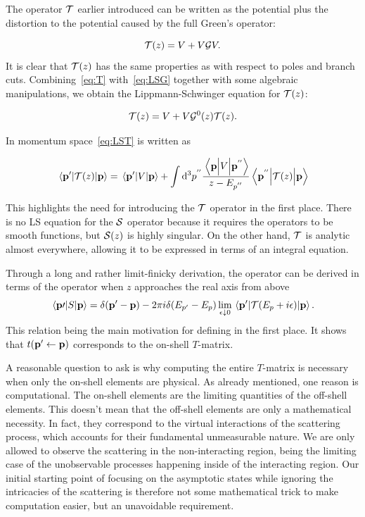 The operator \(\mathcal{T}\) earlier introduced can be written as the potential plus the
distortion to the potential caused by the full Green's operator\cite[p.~137]{taylor}:

\begin{equation}
  \label{eq:T}
  \mathcal{T}(z) = V + V\mathcal{G}V.
\end{equation}
It is clear that \(\mathcal{T}(z)\) has the same properties as \mgop{} with respect
to poles and branch cuts. Combining~\eqref{eq:T} with~\eqref{eq:LSG} together
with some algebraic manipulations, we obtain the Lippmann-Schwinger equation for \(\mathcal{T}(z)\):

\begin{equation}
  \label{eq:LST}
 \mathcal{T}(z) = V + V\mathcal{G}^{0}(z)\mathcal{T}(z).
\end{equation}

In momentum space~\eqref{eq:LST} is written as

\begin{equation*}
  \mel{\vb{p}^{\prime}}{\mathcal{T}(z)}{\vb{p}} = \mel{\vb{p}^{\prime}}{V}{\vb{p}}
  + \int\dd^{3}p^{''} \frac{\mel{\vb{p}}{V}{\vb{p^{''}}}}{z-E_{p^{''}}}\mel{\vb{p}^{''}}{\mathcal{T}(z)}{\vb{p}}
\end{equation*}

This highlights the need for introducing the \(\mathcal{T}\) operator in the first
place. There is no LS equation for the \(\mathcal{S}\) operator because it requires the
operators to be smooth functions, but \(\mathcal{S}(z)\) is
highly singular. On the other hand, \(\mathcal{T}\) is analytic almost everywhere,
allowing it to be expressed in terms of an integral equation. 

Through a long and rather limit-finicky derivation, the  operator can be
derived in terms of the  operator when \(z\) approaches the real axis
from above
\begin{equation*}
  \mel{\vb{p}\prime}{S}{\vb{p}} = \delta(\vb{p}^{\prime}-\vb{p}) -2\pi i\delta(E_{p^{\prime}}-E_{p})
  \lim_{\epsilon\downarrow 0}\mel{\vb{p}^{\prime}}{\mathcal{T}(E_{p}+i\epsilon)}{\vb{p}}.
\end{equation*}
This relation being the main motivation for defining  in the first
place. It shows that \(t(\vb{p}^{\prime}\leftarrow\vb{p})\) corresponds to the
on-shell \(T\)-matrix.

A reasonable question to ask is why computing the entire \(T\)-matrix is
necessary when only the on-shell elements are physical. As already mentioned,
one reason is computational. The on-shell elements are the limiting quantities
of the off-shell elements. This doesn't mean that the off-shell elements are
only a mathematical necessity. In fact, they correspond to the virtual
interactions of the scattering process, which accounts for their fundamental
unmeasurable nature. We are only allowed to observe the scattering in the
non-interacting region, being the limiting case of the unobservable processes
happening inside of the interacting region. Our initial starting point of
focusing on the asymptotic states while ignoring the intricacies of the
scattering is therefore not some mathematical trick to make computation easier,
but an unavoidable requirement.

